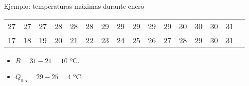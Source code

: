 \documentclass[table]{beamer}
\begin{document}
\begin{frame}
\begin{exampleblock}{Ejemplo: temperaturas máximas durante enero}
\begin{center}
\begin{tabular}{cccccccccccccccc}
                    27 & 27 & 27 & 28 & 28 & 28 & 29 & 29 & 29 & 29 & 29 & 30 & 30 & 30 & 31 & \\
                    17 & 18 & 19 & 20 & 21 & 22 & 23 & 24 & 25 & 26 & 27 & 28 & 29 & 30 & 31 & \\
                \end{tabular}
        \end{center}
        \begin{itemize}
            \item $R = 31 - 21 = 10$ ºC.
            \item $Q_{0.5} = 29 - 25 = 4$ ºC.
        \end{itemize}
    \end{exampleblock}
\end{frame}
\end{document}
